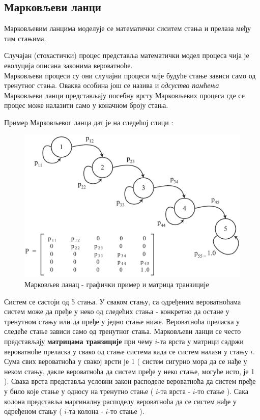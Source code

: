 \subsection{Марковљеви ланци}
Марковљевим ланцима моделује се математички сиситем стања и прелаза међу тим стањима. 
\begin{de}
Случајан (стохастички) процес представља математички модел процеса чија је еволуција описана законима вероватноће. \\
Марковљеви процеси су они случајни процеси чије будуће стање зависи само од тренутног стања. Оваква особина још се назива и \textit{одсуство памћења} \\
Марковљеви ланци представљају посебну врсту Марковљевих процеса где се процес може налазити само у коначном броју стања.
\end{de}

Пример Марковљевог ланца дат је на следећој слици :


\begin{figure}[H]
    \centering
\captionsetup{justification=centering}
   \includegraphics[scale=0.8]{./Slike/slika20.png} 
	\caption{Марковљев ланац - графички пример и матрица транзиције} 
	\label{fig:slika20}
\end{figure}

Систем се састоји од 5 стања. У сваком стању, са одређеним вероватноћама систем може да пређе у неко од следећих стања - конкретно да остане у тренутном стању или да пређе у једно стање ниже. Вероватноћа преласка у следеће стање зависи само од тренутног стања. Марковљеви ланци се често представљају \textbf{матрицама транзиције} при чему $i$-та врста у матрици садржи вероватноће преласка у свако од стање система када се систем налази у стању  $i$. Сума свих вероватноћа у свакој врсти је 1 ( систем сигурно мора да се нађе у неком стању, дакле вероватноћа да систем пређе у неко стање, могуће исто, је 1 ). Свака врста представља условни закон расподеле вероватноћа да систем пређе у било које стање у односу на тренутно стање ( $i$-та врста - $i$-то стање ).
Сака колона представља маргиналну расподелу вероватноћа да се систем нађе у одређеном стању ( $i$-та колона - $i$-то стање ). 


